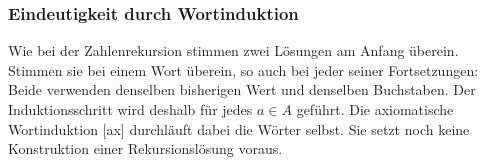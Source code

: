 \subsubsection{Eindeutigkeit durch Wortinduktion}

Wie bei der Zahlenrekursion stimmen zwei Lösungen am Anfang überein.
Stimmen sie bei einem Wort überein, so auch bei jeder seiner
Fortsetzungen: Beide verwenden denselben bisherigen Wert und denselben
Buchstaben. Der Induktionsschritt wird deshalb für jedes \(a\in A\)
geführt. Die axiomatische Wortinduktion
[ax] durchläuft dabei die
Wörter selbst.
Sie setzt noch keine Konstruktion einer Rekursionslösung voraus.

\noindent\begin{minipage}{\linewidth}
\end{minipage}\par
